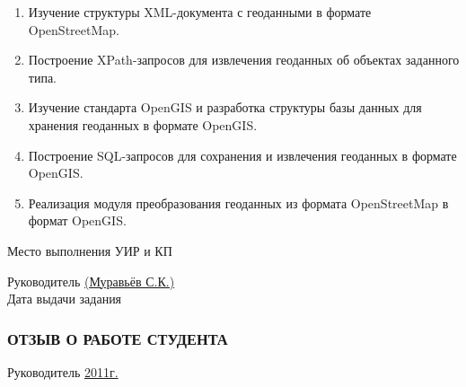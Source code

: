 \documentclass[12pt,a4paper,oneside]{article} %
\begin{document}
\large{\begin{enumerate}
\item Изучение структуры XML-документа с геоданными в формате \linebreak
OpenStreetMap.
\item Построение XPath-запросов для извлечения геоданных об объектах \linebreak
заданного типа.
\item Изучение стандарта OpenGIS и разработка структуры базы \linebreak
данных для хранения геоданных в формате OpenGIS.
\item Построение SQL-запросов для сохранения и извлечения геоданных \linebreak
в формате OpenGIS.
\item Реализация модуля преобразования геоданных из формата \linebreak
OpenStreetMap в формат OpenGIS.
\end{enumerate}}

\newpage
\normalsize{\begin{flushleft}
Место выполнения УИР и КП \underline{\hspace{11,15cm}}

Руководитель \underline{\hspace{10,95cm} (Муравьёв С.К.)}
\\[8pt]
Дата выдачи задания \underline{\hspace{12,8cm}}
\end{flushleft}

\newpage
\subsubsection*{ОТЗЫВ О РАБОТЕ СТУДЕНТА}

\vfill
Руководитель \underline{\hspace{8cm}\glqq{\hspace{1cm}}\grqq\hspace{4cm}2011г.}}
\end{document}
